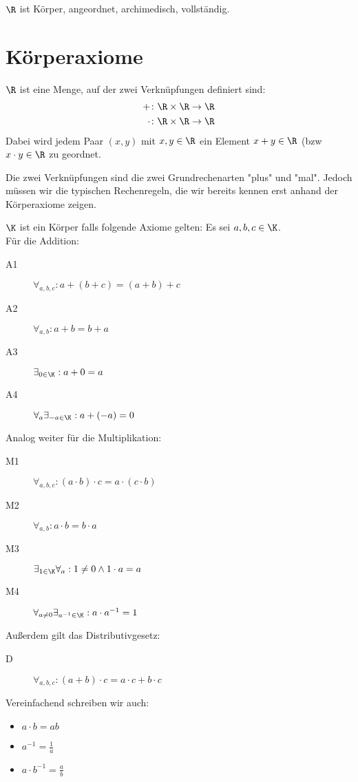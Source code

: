 $\R$ ist Körper, angeordnet, archimedisch, vollständig. \\
\section{Körperaxiome}
\begin{definition}[$\R$] 
$\R$ ist eine Menge, auf der zwei Verknüpfungen definiert sind:
\begin{align*}
+ &\colon \R \times \R \to \R \\
\cdot  &\colon \R \times \R \to \R 
\end{align*}
Dabei wird jedem Paar $(x,y)$ mit $x,y \in \R$ ein Element $x+y \in \R$ (bzw $x\cdot y \in \R$ zu geordnet.  
\end{definition}
\begin{remark}
Die zwei Verknüpfungen sind die zwei Grundrechenarten "plus" und "mal". 
Jedoch müssen wir die typischen Rechenregeln, die wir bereits kennen erst anhand der Körperaxiome zeigen.
\end{remark}
\begin{definition}[Körper]
	$\K$ ist ein Körper falls folgende Axiome gelten:
	Es sei $a,b,c \in \K$. \\
	Für die Addition:
	\begin{description}
		\item [A1] $\forall_{a,b,c}: a+(b+c) = (a+b)+c$
		\item [A2] $\forall_{a,b}: a+b = b+a $
		\item [A3] $\exists_{0 \in \K}: a+0=a $
		\item [A4] $\forall_{a}\exists_{-a \in \K}: a+(-a)=0$
	\end{description}
	Analog weiter für die Multiplikation:
	\begin{description}
		\item [M1] $\forall_{a,b,c}: (a\cdot b) \cdot c = a \cdot (c \cdot b) $
		\item [M2] $\forall_{a,b}: a \cdot b = b \cdot a $
		\item [M3] $\exists_{1 \in \K}\forall_{a}: 1\neq 0 \wedge 1\cdot a=a$
		\item [M4] $\forall_{a\neq 0}\exists_{a^{-1} \in \K}: a\cdot a^{-1}=1 $  
	\end{description}
	Außerdem gilt das Distributivgesetz:
	\begin{description}
		\item [D] $\forall_{a,b,c}: (a+b)\cdot c = a\cdot c + b\cdot c $
	\end{description}
\end{definition}
\begin{notation}
Vereinfachend schreiben wir auch:
\begin{itemize}
	\item $a\cdot b = ab$
	\item $a^{-1}=\frac{1}{a}$
	\item $a\cdot b^{-1}= \frac{a}{b}$ 
\end{itemize}
\end{notation}
